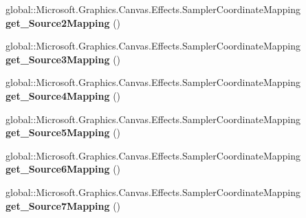 \begin{DoxyCompactItemize}
\mbox{\label{interface_microsoft_1_1_graphics_1_1_canvas_1_1_effects_1_1_i_pixel_shader_effect_a8e61e847709be6c71a435ed84b982518}} 
global\+::\+Microsoft.\+Graphics.\+Canvas.\+Effects.\+Sampler\+Coordinate\+Mapping {\bfseries get\+\_\+\+Source2\+Mapping} ()
\item 
\mbox{\label{interface_microsoft_1_1_graphics_1_1_canvas_1_1_effects_1_1_i_pixel_shader_effect_acfc1600040051da66003009f6affb811}} 
global\+::\+Microsoft.\+Graphics.\+Canvas.\+Effects.\+Sampler\+Coordinate\+Mapping {\bfseries get\+\_\+\+Source3\+Mapping} ()
\item 
\mbox{\label{interface_microsoft_1_1_graphics_1_1_canvas_1_1_effects_1_1_i_pixel_shader_effect_a55c803e42e05c03a5891ec75e70194da}} 
global\+::\+Microsoft.\+Graphics.\+Canvas.\+Effects.\+Sampler\+Coordinate\+Mapping {\bfseries get\+\_\+\+Source4\+Mapping} ()
\item 
\mbox{\label{interface_microsoft_1_1_graphics_1_1_canvas_1_1_effects_1_1_i_pixel_shader_effect_a91d8e2776b0f2a2fb04dddb8eac88fd4}} 
global\+::\+Microsoft.\+Graphics.\+Canvas.\+Effects.\+Sampler\+Coordinate\+Mapping {\bfseries get\+\_\+\+Source5\+Mapping} ()
\item 
\mbox{\label{interface_microsoft_1_1_graphics_1_1_canvas_1_1_effects_1_1_i_pixel_shader_effect_a2dd085feeda544a2d79d7241eeddf607}} 
global\+::\+Microsoft.\+Graphics.\+Canvas.\+Effects.\+Sampler\+Coordinate\+Mapping {\bfseries get\+\_\+\+Source6\+Mapping} ()
\item 
\mbox{\label{interface_microsoft_1_1_graphics_1_1_canvas_1_1_effects_1_1_i_pixel_shader_effect_a64ff2be90cd4dfc1642baf2c5cde418c}} 
global\+::\+Microsoft.\+Graphics.\+Canvas.\+Effects.\+Sampler\+Coordinate\+Mapping {\bfseries get\+\_\+\+Source7\+Mapping} ()
\item 

\end{DoxyCompactItemize}
